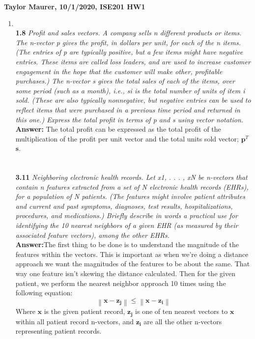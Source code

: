 \documentclass[11pt]{article}
\newcommand{\norm}[1]{\left\lVert#1\right\rVert}
\begin{document}
\textbf{Taylor Maurer, 10/1/2020, ISE201 HW1}
\begin{enumerate}
\item  \           \\
    

\textbf{1.8} \emph{ Profit and sales vectors. A company sells n different products or items. The n-vector p
gives the profit, in dollars per unit, for each of the n items. (The entries of p are typically
positive, but a few items might have negative entries. These items are called loss leaders,
and are used to increase customer engagement in the hope that the customer will make
other, profitable purchases.) The n-vector s gives the total sales of each of the items, over
some period (such as a month), i.e., si is the total number of units of item i sold. (These
are also typically nonnegative, but negative entries can be used to reflect items that were
purchased in a previous time period and returned in this one.) Express the total profit in
terms of p and s using vector notation.}
\\\textbf{Answer: } The total profit can be expressed as the total profit of the multiplication of the profit per unit vector and the total units sold vector; $\bm{p}^T$$\bm{s}$.\\
\\
\\\textbf{3.11} \emph{Neighboring electronic health records. Let x1, . . . , xN be n-vectors that contain n features
extracted from a set of N electronic health records (EHRs), for a population of N patients.
(The features might involve patient attributes and current and past symptoms, diagnoses,
test results, hospitalizations, procedures, and medications.) Briefly describe in words a
practical use for identifying the 10 nearest neighbors of a given EHR (as measured by
their associated feature vectors), among the other EHRs.}
\\\textbf{Answer:}The first thing to be done is to understand the magnitude of the features within the vectors. This is important as when we're doing a distance approach
we want the magnitudes of the features to be about the same. That way one feature isn't skewing the distance calculated. Then for the given patient, we perform the nearest neighbor approach 10 times using the following equation:
\begin{equation}
\norm{\bm{x} - \bm{z_j}} \le \norm{\bm{x} - \bm{z_i}}
\end{equation}
Where $\bm{x}$ is the given patient record, $\bm{z_j}$ is one of ten nearest vectors to $\bm{x}$ within all patient record n-vectors, and $\bm{z_i}$ are all the other n-vectors representing patient records.\\
$$
\end{enumerate}
\end{document}
